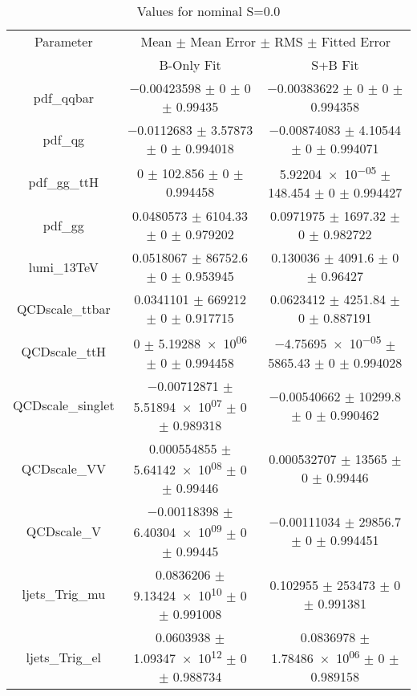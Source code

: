 \begin{table}
\centering
\caption{Values for nominal S=0.0}
\begin{tabular}{ccc}
\toprule
Parameter & \multicolumn{2}{c}{Mean $\pm$ Mean Error $\pm$ RMS $\pm$ Fitted Error}\\
 & B-Only Fit & S+B Fit\\
\midrule
pdf\_qqbar & \num{-0.00423598} $\pm$ \num{0} $\pm$ \num{0} $\pm$ \num{0.99435} & \num{-0.00383622} $\pm$ \num{0} $\pm$ \num{0} $\pm$ \num{0.994358}\\
pdf\_qg & \num{-0.0112683} $\pm$ \num{3.57873} $\pm$ \num{0} $\pm$ \num{0.994018} & \num{-0.00874083} $\pm$ \num{4.10544} $\pm$ \num{0} $\pm$ \num{0.994071}\\
pdf\_gg\_ttH & \num{0} $\pm$ \num{102.856} $\pm$ \num{0} $\pm$ \num{0.994458} & \num{5.92204e-05} $\pm$ \num{148.454} $\pm$ \num{0} $\pm$ \num{0.994427}\\
pdf\_gg & \num{0.0480573} $\pm$ \num{6104.33} $\pm$ \num{0} $\pm$ \num{0.979202} & \num{0.0971975} $\pm$ \num{1697.32} $\pm$ \num{0} $\pm$ \num{0.982722}\\
lumi\_13TeV & \num{0.0518067} $\pm$ \num{86752.6} $\pm$ \num{0} $\pm$ \num{0.953945} & \num{0.130036} $\pm$ \num{4091.6} $\pm$ \num{0} $\pm$ \num{0.96427}\\
QCDscale\_ttbar & \num{0.0341101} $\pm$ \num{669212} $\pm$ \num{0} $\pm$ \num{0.917715} & \num{0.0623412} $\pm$ \num{4251.84} $\pm$ \num{0} $\pm$ \num{0.887191}\\
QCDscale\_ttH & \num{0} $\pm$ \num{5.19288e+06} $\pm$ \num{0} $\pm$ \num{0.994458} & \num{-4.75695e-05} $\pm$ \num{5865.43} $\pm$ \num{0} $\pm$ \num{0.994028}\\
QCDscale\_singlet & \num{-0.00712871} $\pm$ \num{5.51894e+07} $\pm$ \num{0} $\pm$ \num{0.989318} & \num{-0.00540662} $\pm$ \num{10299.8} $\pm$ \num{0} $\pm$ \num{0.990462}\\
QCDscale\_VV & \num{0.000554855} $\pm$ \num{5.64142e+08} $\pm$ \num{0} $\pm$ \num{0.99446} & \num{0.000532707} $\pm$ \num{13565} $\pm$ \num{0} $\pm$ \num{0.99446}\\
QCDscale\_V & \num{-0.00118398} $\pm$ \num{6.40304e+09} $\pm$ \num{0} $\pm$ \num{0.99445} & \num{-0.00111034} $\pm$ \num{29856.7} $\pm$ \num{0} $\pm$ \num{0.994451}\\
ljets\_Trig\_mu & \num{0.0836206} $\pm$ \num{9.13424e+10} $\pm$ \num{0} $\pm$ \num{0.991008} & \num{0.102955} $\pm$ \num{253473} $\pm$ \num{0} $\pm$ \num{0.991381}\\
ljets\_Trig\_el & \num{0.0603938} $\pm$ \num{1.09347e+12} $\pm$ \num{0} $\pm$ \num{0.988734} & \num{0.0836978} $\pm$ \num{1.78486e+06} $\pm$ \num{0} $\pm$ \num{0.989158}\\

\end{tabular}
\end{table}
